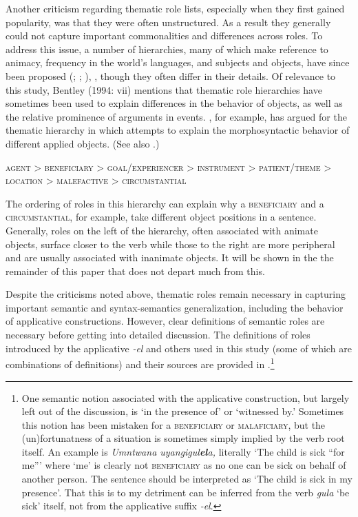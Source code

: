 \documentclass[output=paper]{langsci/langscibook}
\begin{document}
Another criticism regarding thematic role lists, especially when they first gained popularity, was that they were often unstructured. As a result they generally could not capture important commonalities and differences across roles. To address this issue, a number of hierarchies, many of which make reference to animacy, frequency in the world’s languages, and subjects and objects, have since been proposed (\citealt{Fillmore1968};  \citealt[12]{SaintDizierViegas1995};    \citealt[334]{KiyosawaGerdts2010}), \citet{BresnanKanerva1989}, though they often differ in their details. Of relevance to this study, Bentley (1994: vii) mentions that thematic role hierarchies have sometimes been used to explain differences in the behavior of objects, as well as the relative prominence of arguments in events. \citet[129]{Mchombo2004}, for example, has argued for the thematic hierarchy in  which attempts to explain the morphosyntactic behavior of different applied objects. (See also \citealt{NgonyaniGithinji2006}.)

\ea
\textsc{agent > beneficiary > goal/experiencer > instrument > patient/theme > location > malefactive > circumstantial}\\
\z

\newpage 
The ordering of roles in this hierarchy can explain why a \textsc{beneficiary} and a \textsc{circumstantial}, for example, take different object positions in a  sentence. Generally, roles on the left of the hierarchy, often associated with animate objects, surface closer to the verb while those to the right are more peripheral and are usually associated with inanimate objects. It will be shown in the the remainder of this paper that  does not depart much from this.

 Despite the criticisms noted above, thematic roles remain necessary in capturing important semantic and syntax-semantics generalization, including the behavior of applicative constructions. However, clear definitions of semantic roles are necessary before getting into detailed discussion. The definitions of roles introduced by the  applicative \textit{-el} and others used in this study (some of which are combinations of definitions) and their sources are provided in .\footnote{One semantic notion associated with the  applicative construction, but largely left out of the discussion, is ‘in the presence of’ or ‘witnessed by.’ Sometimes this notion has been mistaken for a \textsc{beneficiary} or \textsc{malaficiary}, but the (un)fortunatness of a situation is sometimes simply implied by the verb root itself. An example is \textit{Umntwana uyangigul}\textbf{\textit{el}}\textit{a,} literally ‘The child is sick “for me”’ where ‘me’ is clearly not \textsc{beneficiary} as no one can be sick on behalf of another person. The sentence should be interpreted as ‘The child is sick in my presence’. That this is to my detriment can be inferred from the verb \textit{gula} ‘be sick’ itself, not from the applicative suffix \textit{-el}.} 
\end{document}
